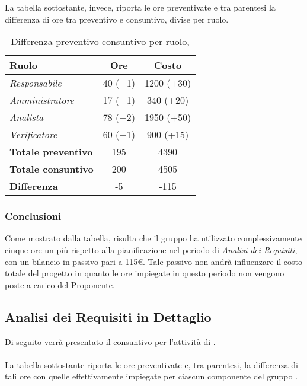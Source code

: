 La tabella sottostante, invece, riporta le ore preventivate e  tra parentesi la differenza di ore tra preventivo e consuntivo, divise per ruolo.

\begin{table}[H]
	\begin{center}
		\begin{tabular}{|l|c|c|}
			\hline
			\textbf{Ruolo}	& \textbf{Ore} & \textbf{Costo} \\
			\hline
			\textit{Responsabile}		&	40 (+1)	&	1200 (+30)	\\
			\hline
			\textit{Amministratore}		&	17 (+1)	&	340 (+20)	\\
			\hline
			\textit{Analista}			&	78 (+2)	&	1950 (+50)	\\
			\hline
			\textit{Verificatore}		&	60 (+1)	&	900 (+15)	\\
			\hline
			\textbf{Totale preventivo}	&	195		&	4390 		\\
			\hline
			\textbf{Totale consuntivo}	&	200		&   4505		\\
			\hline
			\textbf{Differenza} 		&	-5		&	-115		\\
			\hline
		\end{tabular}
	\end{center}
	\caption{Differenza preventivo-consuntivo per ruolo, \AdR}
\end{table}
 
\subsubsection{Conclusioni}

Come mostrato dalla tabella, risulta che il gruppo ha utilizzato complessivamente cinque ore un più rispetto alla pianificazione nel periodo di \textit{Analisi dei Requisiti}, con un bilancio in passivo pari a 115€. Tale passivo non andrà influenzare il costo totale del progetto in quanto le ore impiegate in questo periodo non vengono poste a carico del Proponente.

\subsection{Analisi dei Requisiti in Dettaglio}
Di seguito verrà presentato il consuntivo per l'attività di \textit{\AD}.
\\\\
La tabella sottostante riporta le ore preventivate e, tra parentesi, la differenza di tali ore con quelle effettivamente impiegate per ciascun componente del gruppo \gruppo.

